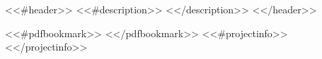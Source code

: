 <<#header>>
<<#description>>
<</description>>
<</header>>


<<#pdfbookmark>>
<</pdfbookmark>>
<<#projectinfo>>
<</projectinfo>>
